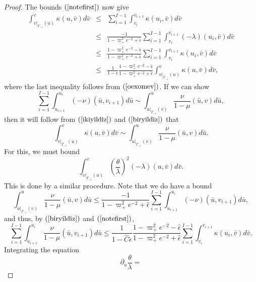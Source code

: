 \documentclass{article}
\begin{document}
{\begin{proof}
The bounds $(\ref{notefirst})$ now give
\begin{eqnarray}
\label{ikiyildiz}
\nonumber
\int_{v|_{\Gamma_{-\overline\epsilon}}(u)}^{v}
\kappa (u,\bar{v})d\bar{v}&\le&
\sum_{i=1}^{I-1}\int_{v_i}^{v_{i+1}}\kappa(u_i,\bar{v}) d\bar{v}\\
\nonumber
&\le&
\frac{-1}{1-\varpi_+^2e^{-2}+\hat{\epsilon}}
\sum_{i=1}^{I-1}\int_{v_i}^{v_{i+1}}(-\lambda)(u_i,\bar{v}) d\bar{v}\\
\nonumber
&\le&\frac{1-\varpi_+^2e^{-2}-\hat{\epsilon}}
{1-\varpi_+^2e^{-2}+\hat{\epsilon}}
\sum_{i=1}^{I-1}\int_{v_i}^{v_{i+1}}\kappa(u_i,\bar{v}) d\bar{v}\\
&\le&
\frac{1}{1-\epsilon}
\frac{1-\varpi_+^2e^{-2}-\hat{\epsilon}}
{1-\varpi_+^2e^{-2}+\hat{\epsilon}}
\int_{v|_{\Gamma_{-\overline\epsilon}}(u)}^{v}
\kappa(u,\bar{v})d\bar{v},
\end{eqnarray}
where the last inequality follows from $(\ref{oexomev})$.
If we can show
\begin{equation}
\label{ifwe}
\sum_{i=1}^{I-1}\int_{u_{i+1}}^{u_i}(-\nu)(\bar{u},v_{i+1}) d\bar{u}\sim
\int_{u|_{\Gamma_{-\overline\epsilon}}(v)}^{u}
\frac{\nu}{1-\mu}(\bar{u},v)d\bar{u},
\end{equation}
then it will follow
from $(\ref{ikiyildiz})$ and $(\ref{biryildiz})$ that
\begin{equation}
\label{thenit}
\int_{v|_{\Gamma_{-\overline\epsilon}}(u)}^{v}
\kappa(u,\bar{v})d\bar{v}\sim
\int_{u|_{\Gamma_{-\overline\epsilon}}(v)}^u
\frac{\nu}{1-\mu}(\bar{u},v)d\bar{u}.
\end{equation}
For this, we must bound
\[
\int_{v|_{\Gamma_{-\bar\epsilon}}(u)}^v
{\left(\frac\theta\lambda\right)^2(-\lambda)(u,\bar{v})d\bar{v}}.
\]
This is done by a similar procedure.
Note that we do have a bound
\[
\int_{u|_{\Gamma_{-\overline\epsilon}}(v)}^{u}
\frac{\nu}{1-\mu}(\bar{u},v)d\bar{u}\le 
\frac{-1}{1-\varpi_+^2e^{-2}+\hat{\epsilon}}
\sum_{i=1}^{I-1}\int_{u_{i+1}}^{u_i}(-\nu)(\bar{u},v_{i+1}) d\bar{u},
\]
and thus, by $(\ref{biryildiz})$ and $(\ref{notefirst})$,
\begin{equation}
\label{suvepws}
\sum_{i=1}^{I-1}\int_{u_{i+1}}^{u_i}\frac\nu{1-\mu}(\bar{u},v_{i+1}) d\bar{u}\le 
\frac{1}{1-\hat{C}\overline\epsilon}
\frac{1-\varpi_+^2e^{-2}-\hat{\epsilon}}
{1-\varpi_+^2e^{-2}+\hat{\epsilon}}
\sum_{i=1}^{I-1}\int_{v_i}^{v_{i+1}}\kappa(u_i,\bar{v}) d\bar{v}.
\end{equation}
Integrating the equation
\begin{equation}
\label{toallo}
\partial_u\frac\theta\lambda=

\end{equation}
\end{proof}}
\end{document}

